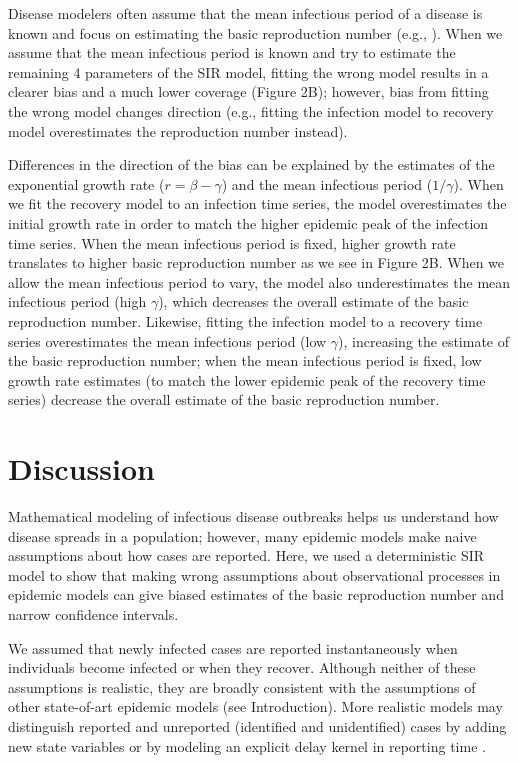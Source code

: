 \documentclass{article}\usepackage[]{graphicx}\usepackage[]{color}
\begin{document}
Disease modelers often assume that the mean infectious period of a disease
is known and focus on estimating the basic reproduction number (e.g.,
\cite{hooker2010parameterizing, lin2016seasonality, pons2018serotype}). 
When we assume that the mean infectious period is known
and try to estimate the remaining 4 parameters of the SIR model, fitting the
wrong model results in a clearer bias and a much lower coverage (Figure 2B); however, 
bias from fitting the wrong model changes direction (e.g., fitting the infection
model to recovery model overestimates the reproduction number instead). 

Differences in the direction of the bias can be explained by the estimates of the
exponential growth rate ($r = \beta - \gamma$) and the mean infectious period ($1/\gamma$).
When we fit the recovery model to an infection time series, the model overestimates
the initial growth rate in order to match the higher epidemic peak of the 
infection time series. When the mean infectious period is fixed, higher growth rate
translates to higher basic reproduction number as we see in Figure 2B. When we allow
the mean infectious period to vary, the model also underestimates the mean infectious
period (high $\gamma$), which decreases the overall estimate of the basic reproduction number.
Likewise, fitting the infection model to a recovery time series overestimates the
mean infectious period (low $\gamma$), increasing the estimate of the basic reproduction number;
when the mean infectious period is fixed, low growth rate estimates (to match the
lower epidemic peak of the recovery time series) decrease the overall estimate of the
basic reproduction number.

\section{Discussion}

Mathematical modeling of infectious disease outbreaks helps us understand 
how disease spreads in a population; however, many epidemic models make 
naive assumptions about how cases are reported. 
Here, we used a deterministic SIR model to show that 
making wrong assumptions about observational processes in epidemic models
can give biased estimates of the basic reproduction number and narrow
confidence intervals.

We assumed that newly infected cases are reported instantaneously when
individuals become infected or when they recover. Although neither of these
assumptions is realistic, they are broadly consistent with the assumptions
of other state-of-art epidemic models (see Introduction). 
More realistic models may distinguish reported and unreported
(identified and unidentified) cases by adding
new state variables \citep{browne2015modeling,webb2015model} 
or by modeling an explicit delay kernel in reporting time 
\citep{harris1990reporting, ferguson2001foot, ster2009epidemiological, 
birrell2011bayesian, funk2018real}.
\end{document}
